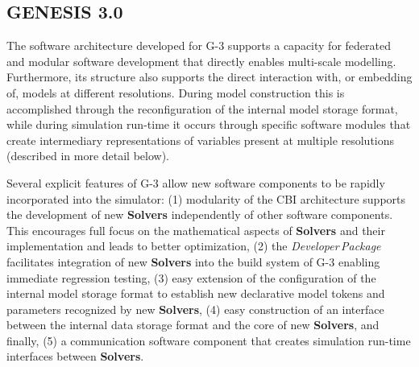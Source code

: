 \documentclass[11pt,3p,twocolumn]{JMN}
\begin{document}




\subsection{GENESIS 3.0}

The software architecture developed for G-3 supports a capacity for federated and modular software development that directly enables multi-scale modelling.  Furthermore, its structure also supports the direct interaction with, or embedding of, models at different resolutions.  During model construction this is accomplished through the reconfiguration of the internal model storage format, while during simulation run-time it occurs through specific software modules that create intermediary representations of variables present at multiple resolutions (described in more detail below).

Several explicit features of G-3 allow new software components to be rapidly incorporated into the simulator: (1) modularity of the CBI architecture supports the development of new {\bf Solvers} independently of other software components. This encourages full focus on the mathematical aspects of {\bf Solvers} and their implementation and leads to better optimization, (2) the {\it Developer\,Package} facilitates integration of new {\bf Solvers} into the build system of G-3 enabling immediate regression testing, (3) easy extension of the configuration of the internal model storage format to establish new declarative model tokens and parameters recognized by new {\bf Solvers}, (4) easy construction of an interface between the internal data storage format and the core of new {\bf Solvers}, and finally, (5) a communication software component that creates simulation run-time interfaces between {\bf Solvers}.
\end{document}
